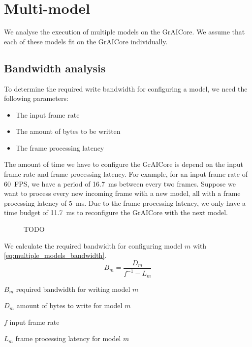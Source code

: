 \section{Multi-model}
We analyse the execution of multiple models on the GrAICore.
We assume that each of these models fit on the GrAICore individually.

\subsection{Bandwidth analysis}

To determine the required write bandwidth for configuring a model, we need the following parameters:
\begin{itemize}
    \item The input frame rate
    \item The amount of bytes to be written
    \item The frame processing latency
\end{itemize}

The amount of time we have to configure the GrAICore is depend on the input frame rate and frame processing latency.
For example, for an input frame rate of \SI{60}{FPS}, we have a period of \SI{16.7}{ms} between every two frames.
Suppose we want to process every new incoming frame with a new model, all with a frame processing latency of \SI{5}{ms}. 
Due to the frame processing latency, we only have a time budget of \SI{11.7}{ms} to reconfigure the GrAICore with the next model.

\begin{figure}[htbp]
    \centering
    
    \caption{TODO}
    \label{fig:reconfig_time_line_ex3}
\end{figure}

We calculate the required bandwidth for configuring model $m$ with \cref{eq:multiple_models_bandwidth}.
\begin{equation}
    B_m = \frac{D_m}{f^{-1} - L_m}
    \label{eq:multiple_models_bandwidth}
\end{equation}

\begin{eqexpl}[15mm]
    \item{$B_m$} required bandwidth for writing model $m$
    \item{$D_m$} amount of bytes to write for model $m$
    \item{$f$} input frame rate
    \item{$L_m$} frame processing latency for model $m$
\end{eqexpl}

